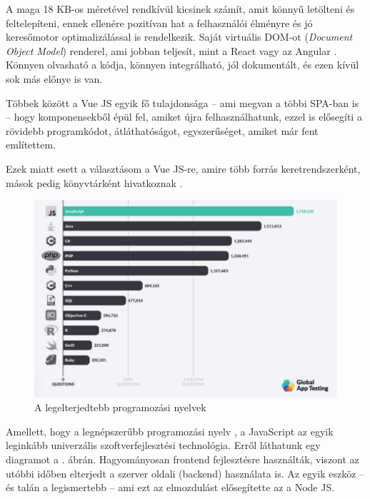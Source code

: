 A maga 18 KB-os méretével rendkívül kicsinek számít, amit könnyű letölteni és feltelepíteni, ennek ellenére pozitívan hat a felhasználói élményre és jó keresőmotor optimalizálással is rendelkezik. Saját virtuális DOM-ot (\textit{Document Object Model}) renderel, ami jobban teljesít, mint a React vagy az Angular \cite{benchmark}. Könnyen olvasható a kódja, könnyen integrálható, jól dokumentált, és ezen kívül sok más előnye is van.

Többek között a Vue JS egyik fő tulajdonsága -- ami megvan a többi SPA-ban is -- hogy komponensekből épül fel, amiket újra felhasználhatunk, ezzel is elősegíti a rövidebb programkódot, átláthatóságot, egyszerűséget, amiket már fent említettem.

Ezek miatt esett a választásom a Vue JS-re, amire több forrás keretrendszerként, mások pedig könyvtárként hivatkoznak
\cite{vue}.


\begin{figure}[h!]
	\centering
	\includegraphics[width=\textwidth]{images/js-popilarity.png}
	\caption{A legelterjedtebb programozási nyelvek \cite{js-popularity}}
	\label{fig:js-popularity}
\end{figure}

Amellett, hogy a legnépszerűbb programozási nyelv \cite{js-popularity}, a JavaScript az egyik leginkább univerzális szoftverfejlesztési technológia. Erről láthatunk egy diagramot a . ábrán. Hagyományosan frontend fejlesztésre használták, viszont az utóbbi időben elterjedt a szerver oldali (backend) használata is. Az egyik eszköz -- és talán a legismertebb -- ami ezt az elmozdulást elősegítette az a Node JS.

